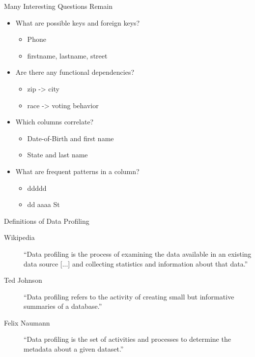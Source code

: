 \documentclass[aspectratio=169]{../latex_main/tntbeamer}  %
\begin{document}
\begin{frame}[c]{Many Interesting Questions Remain}

\begin{itemize}
    \item What are possible keys and foreign keys?
    \begin{itemize}
        \item Phone
        \item firstname, lastname, street 
    \end{itemize}
    \item Are there any functional dependencies?
    \begin{itemize}
        \item zip -> city
        \item race -> voting behavior 
    \end{itemize}
    \item Which columns correlate?
    \begin{itemize}
        \item Date-of-Birth and first name 
        \item State and last name
    \end{itemize}
    \item What are frequent patterns in a column?
    \begin{itemize}
        \item ddddd
        \item dd aaaa St
    \end{itemize}

    \end{itemize}

\end{frame}

\begin{frame}[c]{Definitions of Data Profiling}

\begin{description}
    \item[Wikipedia] ``Data profiling is the process of examining the data available in an existing data source [...] and collecting statistics and information about that data.''
    \item[Ted Johnson] ``Data profiling refers to the activity of creating small but informative summaries of a database.''
    \item[Felix Naumann] ``Data profiling is the set of activities and processes to determine the metadata about a given dataset.''
\end{description}

\end{frame}
\end{document}
